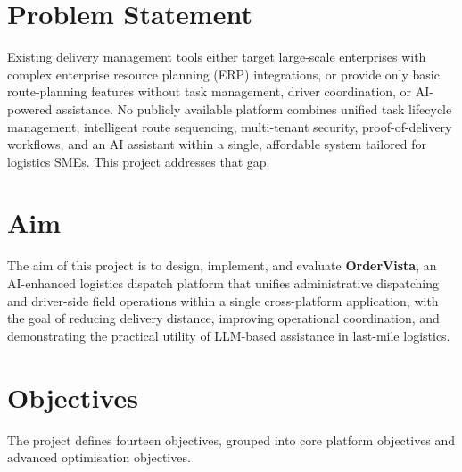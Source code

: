 \section{Problem Statement}
\label{sec:problem}

Existing delivery management tools either target large-scale enterprises with complex enterprise resource planning (ERP) integrations, or provide only basic route-planning features without task management, driver coordination, or AI-powered assistance. No publicly available platform combines unified task lifecycle management, intelligent route sequencing, multi-tenant security, proof-of-delivery workflows, and an AI assistant within a single, affordable system tailored for logistics SMEs. This project addresses that gap.

\section{Aim}
\label{sec:aim}

The aim of this project is to design, implement, and evaluate \textbf{OrderVista}, an AI-enhanced logistics dispatch platform that unifies administrative dispatching and driver-side field operations within a single cross-platform application, with the goal of reducing delivery distance, improving operational coordination, and demonstrating the practical utility of LLM-based assistance in last-mile logistics.

\section{Objectives}
\label{sec:objectives}

The project defines fourteen objectives, grouped into core platform objectives and advanced optimisation objectives.

